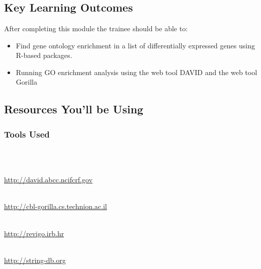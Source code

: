 
\chapter{\moduleTitle}
\newpage


\section{Key Learning Outcomes}

After completing this module the trainee should be able to:
\begin{itemize}
  \item Find gene ontology enrichment in a list of differentially expressed genes using R-based packages.
  \item Running GO enrichment analysis using the web tool DAVID and the web tool Gorilla
  \end{itemize}

\section{Resources You'll be Using}
 
\subsection{Tools Used}
\begin{description}[style=multiline,labelindent=0cm,align=left,leftmargin=0.5cm]
  \item [Goana from Limma]\hfill\\
  	\url{}
  \item[DAVID]\hfill\\
  	\url{http://david.abcc.ncifcrf.gov}
  \item[GOrilla]\hfill\\
  	\url{http://cbl-gorilla.cs.technion.ac.il}
  \item[REVIGO]\hfill\\
  	\url{http://revigo.irb.hr}
  \item[STRING]\hfill\\
    \url{http://string-db.org}
\end{description}

